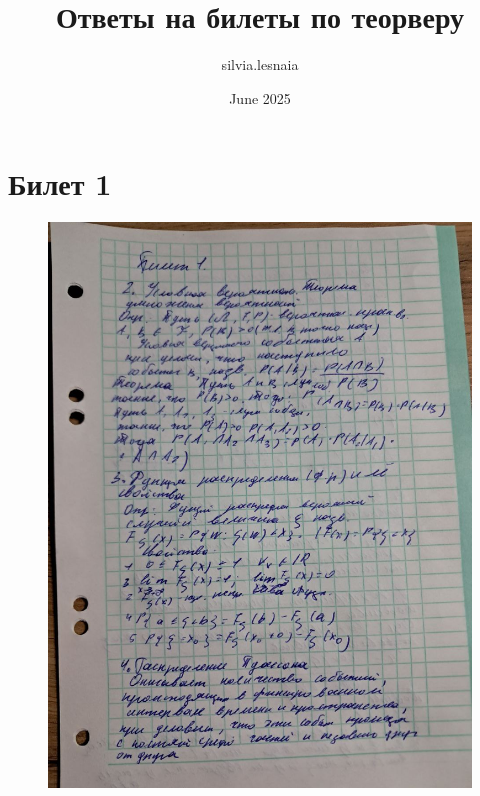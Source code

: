 \documentclass{article}
\title{Ответы на билеты  по теорверу}
\author{silvia.lesnaia }
\date{June 2025}
\begin{document}
\maketitle

\section{Билет 1}

\begin{figure}[H]
    \centering
    \includegraphics[width=1\linewidth]{photo_5323477539961828012_y.jpg}
\end{figure}
\end{document}
